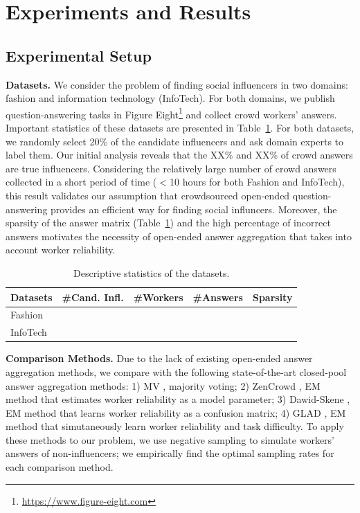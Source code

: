 \section{Experiments and Results}

\subsection{Experimental Setup}

\noindent\textbf{Datasets.} We consider the problem of finding social influencers in two domains: fashion and information technology (InfoTech). For both domains, we publish question-answering tasks in Figure Eight\footnote{\url{https://www.figure-eight.com}} and collect crowd workers' answers. Important statistics of these datasets are presented in Table~\ref{tab:datasets}. For both datasets, we randomly select 20\% of the candidate influencers and ask domain experts to label them. Our initial analysis reveals that the XX\% and XX\% of crowd answers are true influencers. Considering the relatively large number of crowd answers collected in a short period of time ($<$10 hours for both Fashion and InfoTech), this result validates our assumption that crowdsourced open-ended question-answering provides an efficient way for finding social influncers. Moreover, the sparsity of the answer matrix (Table~\ref{tab:datasets}) and the high percentage of incorrect answers motivates the necessity of open-ended answer aggregation that takes into account worker reliability.

\begin{table}[!ht]
\centering \caption{Descriptive statistics of the
datasets.}\label{tab:datasets}
\addtolength{\tabcolsep}{-1mm}
\begin{tabular}{lcccc}
\toprule
    Datasets &\#Cand. Infl. &\#Workers &\#Answers &Sparsity   \\\midrule
    Fashion & & & & \\
    InfoTech & & & & \\
\bottomrule
\end{tabular}
\end{table}

\smallskip
\noindent\textbf{Comparison Methods.} Due to the lack of existing open-ended answer aggregation methods, we compare with the following state-of-the-art closed-pool answer aggregation methods: 1) MV \cite{sheng2008get}, majority voting; 2) ZenCrowd \cite{demartini2012zencrowd}, EM method that estimates worker reliability as a model parameter; 3) Dawid-Skene \cite{dawid1979maximum}, EM method that learns worker reliability as a confusion matrix; 4) GLAD \cite{whitehill2009whose}, EM method that simutaneously learn worker reliability and task difficulty. To apply these methods to our problem, we use negative sampling to simulate workers' answers of non-influencers; we empirically find the optimal sampling rates for each comparison method. 

